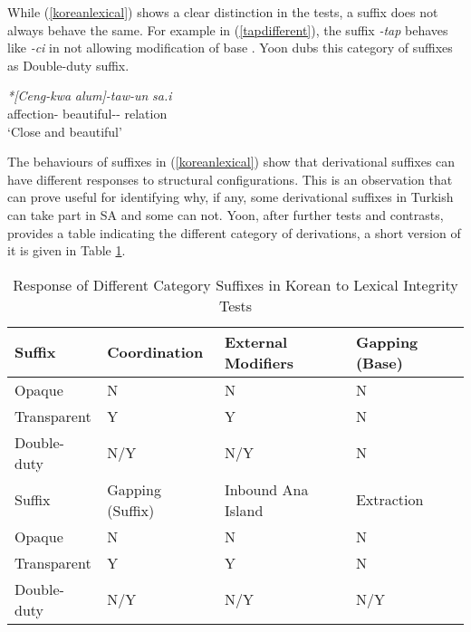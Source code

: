 While (\ref{koreanlexical}) shows a clear distinction in the tests, a suffix does not always behave the same. For example in (\ref{tapdifferent}), the suffix \textit{-tap} behaves like \textit{-ci} in not allowing modification of base . Yoon dubs this category of suffixes as Double-duty suffix.
\begin{exe}
    \ex \label{tapdifferent}
    \gll 
    \textit{*[Ceng-kwa} \textit{alum]-taw-un} \textit{sa.i} \\ affection-{\Conj} beautiful-{\Der}-{\Rel} relation \\ 
    \glt `Close and beautiful'
\end{exe}

The behaviours of suffixes in (\ref{koreanlexical}) show that derivational suffixes can have different responses to structural configurations. This is an observation that can prove useful for identifying why, if any, some derivational suffixes in Turkish can take part in SA and some can not. Yoon, after further tests and contrasts, provides a table indicating the different category of derivations, a short version of it is given in Table \ref{tab:korean}.

\begin{table}[hbt!]
    \caption{Response of Different Category Suffixes in Korean to Lexical Integrity Tests}
    \centering
    \begin{tabular}{|l|l|l|l|}
    \hline 
    Suffix      & Coordination & External Modifiers & Gapping (Base) \\ \hline %
    Opaque        & N             & N                 & N            \\ \hline %
    Transparent   & Y             & Y                 & N            \\ \hline %
    Double-duty   & N/Y           & N/Y               & N            \\ \hline \hline%
    
    Suffix      &    Gapping (Suffix)    & Inbound Ana Island    &   Extraction \\ \hline
    Opaque      &    N                   & N                     &   N   \\ \hline 
    Transparent &    Y                   & Y                     &   N \\ \hline 
    Double-duty &    N/Y                 & N/Y                   &  N/Y \\ \hline 
    
    \end{tabular}
    \label{tab:korean}
\end{table}

